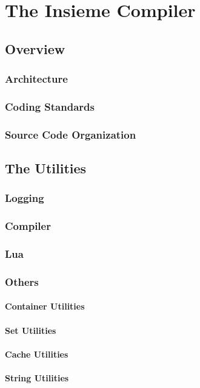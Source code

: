 \chapter{The Insieme Compiler} \label{cap:compiler}

\section{Overview}
\subsection{Architecture}
\subsection{Coding Standards}
\subsection{Source Code Organization}

\section{The Utilities}
\subsection{Logging}
\subsection{Compiler}
\subsection{Lua}
\subsection{Others}
\subsubsection{Container Utilities}
\subsubsection{Set Utilities}
\subsubsection{Cache Utilities}
\subsubsection{String Utilities}
